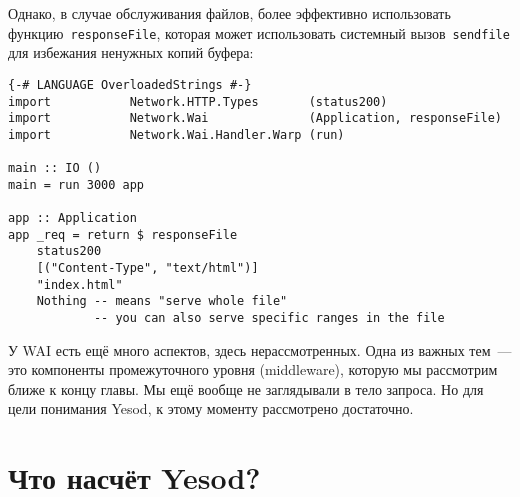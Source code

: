 Однако, в случае обслуживания файлов, более эффективно использовать
функцию~\lstinline'responseFile', которая может использовать системный
вызов~\lstinline'sendfile' для избежания ненужных копий буфера:
\begin{lstlisting}
{-# LANGUAGE OverloadedStrings #-}
import           Network.HTTP.Types       (status200)
import           Network.Wai              (Application, responseFile)
import           Network.Wai.Handler.Warp (run)

main :: IO ()
main = run 3000 app

app :: Application
app _req = return $ responseFile
    status200
    [("Content-Type", "text/html")]
    "index.html"
    Nothing -- means "serve whole file"
            -- you can also serve specific ranges in the file
\end{lstlisting}

У WAI есть ещё много аспектов, здесь нерассмотренных. Одна из важных тем~---
это компоненты промежуточного уровня (middleware), которую мы рассмотрим ближе
к концу главы. Мы ещё вообще не заглядывали в тело запроса. Но для цели
понимания Yesod, к этому моменту рассмотрено достаточно.

\section{Что насчёт Yesod?}
